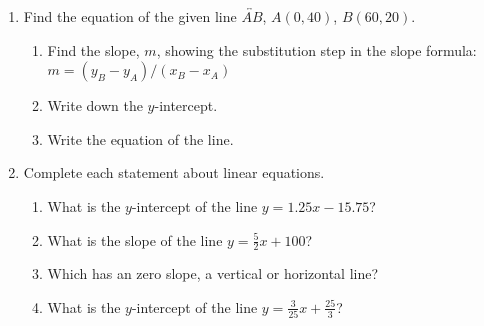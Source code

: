 \begin{enumerate}
\item Find the equation of the given line $\overleftrightarrow{AB}$, $A(0,40)$, $B(60,20)$.
\begin{multicols}{2}
  \begin{enumerate}[itemsep=1.2cm]
    \item Find the slope, $m$, showing the substitution step in the slope formula: \\[0.25cm]
    $\displaystyle m = (y_B - y_A)/(x_B - x_A)$
    \item Write down the $y$-intercept.
    \item Write the equation of the line.
    \end{enumerate}
    \begin{flushright}
      \end{flushright}
\end{multicols}

\item Complete each statement about linear equations.
\begin{enumerate}[itemsep=0.5cm]
  \item What is the $y$-intercept of the line $y = 1.25x - 15.75$?
  \item What is the slope of the line $\displaystyle y = \frac{5}{2}x + 100$?
  \item Which has an zero slope, a vertical or horizontal line?
  \item What is the $y$-intercept of the line $\displaystyle y = \frac{3}{25}x + \frac{25}{3}$?
\end{enumerate}


\end{enumerate}
